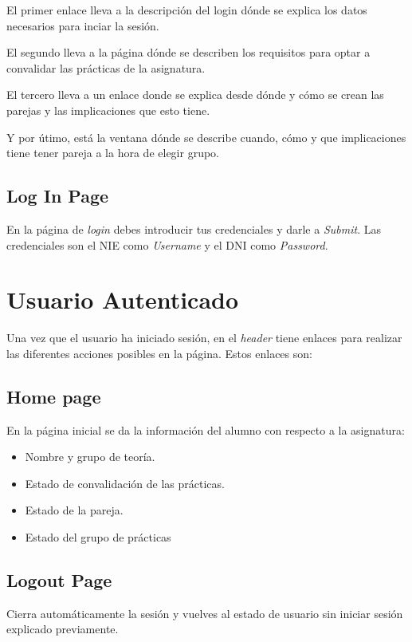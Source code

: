 \documentclass{article}
\begin{document}
El primer enlace lleva a la descripción del login dónde se explica los datos necesarios
para inciar la sesión.

El segundo lleva a la página dónde se describen los requisitos para optar a convalidar las
prácticas de la asignatura.

El tercero lleva a un enlace donde se explica desde dónde y cómo se crean las parejas y las
implicaciones que esto tiene.

Y por útimo, está la ventana dónde se describe cuando, cómo y que implicaciones tiene
tener pareja a la hora de elegir grupo.


\subsection*{Log In Page}

En la página de \textit{login} debes introducir tus credenciales y darle a \textit{Submit}. Las credenciales
son el NIE como \textit{Username}  y el DNI como \textit{Password}.


\section*{Usuario Autenticado}

Una vez que el usuario ha iniciado sesión, en el \textit{header} tiene enlaces para realizar
las diferentes acciones posibles en la página. Estos enlaces son:


\subsection*{Home page}

En la página inicial se da la información del alumno con respecto a la asignatura:
\begin{itemize}
    \item Nombre y grupo de teoría.
    \item Estado de convalidación de las prácticas.
    \item Estado de la pareja.
    \item Estado del grupo de prácticas 
\end{itemize}


\subsection*{Logout Page}

Cierra automáticamente la sesión y vuelves al estado de usuario sin iniciar sesión explicado previamente.
\end{document}
